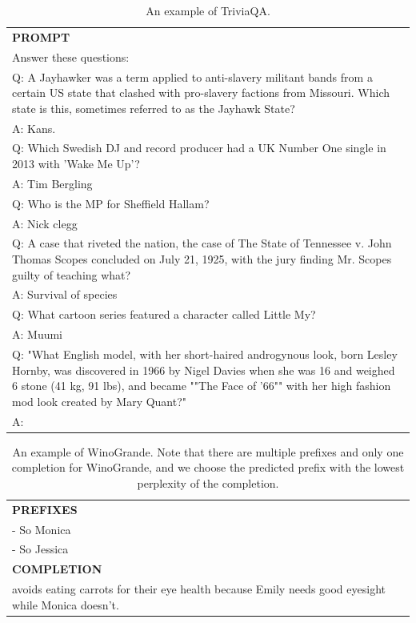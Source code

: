 \begin{table}[h]
    \centering \small
\begin{tabular}{p{12cm}}
\toprule
\textbf{PROMPT}\\
Answer these questions:\\
Q: A Jayhawker was a term applied to anti-slavery militant bands from a certain US state that clashed with pro-slavery factions from Missouri. Which state is this, sometimes referred to as the Jayhawk State?\\
A: Kans.\\
Q: Which Swedish DJ and record producer had a UK Number One single in 2013 with 'Wake Me Up'?\\
A: Tim Bergling\\
Q: Who is the MP for Sheffield Hallam?\\
A: Nick clegg\\
Q: A case that riveted the nation, the case of The State of Tennessee v. John Thomas Scopes concluded on July 21, 1925, with the jury finding Mr. Scopes guilty of teaching what?\\
A: Survival of species\\
Q: What cartoon series featured a character called Little My?\\
A: Muumi\\
Q: "What English model, with her short-haired androgynous look, born Lesley Hornby, was discovered in 1966 by Nigel Davies when she was 16 and weighed 6 stone (41 kg, 91 lbs), and became ""The Face of '66"" with her high fashion mod look created by Mary Quant?"\\
A:\\
\bottomrule
\end{tabular}
    \caption{\centering An example of TriviaQA.}
    \label{tab:triviaqa_eval_format_example}
\end{table}

\begin{table}[h]
    \centering \small
\begin{tabular}{p{12cm}}
\toprule
\textbf{PREFIXES}\\
- So Monica\\
- So Jessica\\
\midrule
\textbf{COMPLETION}\\
avoids eating carrots for their eye health because Emily needs good eyesight while Monica doesn't.\\
\bottomrule
\end{tabular}
    \caption{An example of WinoGrande. Note that there are multiple prefixes and only one completion for WinoGrande, and we choose the predicted prefix with the lowest perplexity of the completion.}
    \label{tab:winogrande_eval_format_example}
\end{table}